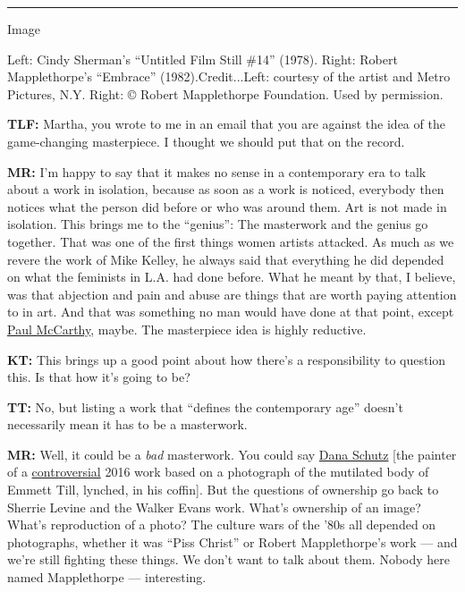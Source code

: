 \begin{center}\rule{0.5\linewidth}{\linethickness}\end{center}

Image

Left: Cindy Sherman's ``Untitled Film Still \#14'' (1978). Right: Robert
Mapplethorpe's ``Embrace'' (1982).Credit...Left: courtesy of the artist
and Metro Pictures, N.Y. Right: © Robert Mapplethorpe Foundation. Used
by permission.

\textbf{TLF:} Martha, you wrote to me in an email that you are against
the idea of the game-changing masterpiece. I thought we should put that
on the record.

\textbf{MR:} I'm happy to say that it makes no sense in a contemporary
era to talk about a work in isolation, because as soon as a work is
noticed, everybody then notices what the person did before or who was
around them. Art is not made in isolation. This brings me to the
``genius'': The masterwork and the genius go together. That was one of
the first things women artists attacked. As much as we revere the work
of Mike Kelley, he always said that everything he did depended on what
the feminists in L.A. had done before. What he meant by that, I believe,
was that abjection and pain and abuse are things that are worth paying
attention to in art. And that was something no man would have done at
that point, except
\href{https://www.nytimes.com/topic/person/paul-mccarthy}{Paul
McCarthy}, maybe. The masterpiece idea is highly reductive.

\textbf{KT:} This brings up a good point about how there's a
responsibility to question this. Is that how it's going to be?

\textbf{TT:} No, but listing a work that ``defines the contemporary
age'' doesn't necessarily mean it has to be a masterwork.

\textbf{MR:} Well, it could be a \emph{bad} masterwork. You could say
\href{https://www.nytimes.com/2019/01/09/arts/design/dana-schutz-painting-emmett-till-petzel-gallery.html}{Dana
Schutz} {[}the painter of a
\href{https://www.nytimes.com/2017/07/27/arts/design/dana-schutz-emmett-till-painting-protests.html}{controversial}
2016 work based on a photograph of the mutilated body of Emmett Till,
lynched, in his coffin{]}. But the questions of ownership go back to
Sherrie Levine and the Walker Evans work. What's ownership of an image?
What's reproduction of a photo? The culture wars of the '80s all
depended on photographs, whether it was ``Piss Christ'' or Robert
Mapplethorpe's work --- and we're still fighting these things. We don't
want to talk about them. Nobody here named Mapplethorpe --- interesting.

